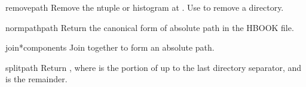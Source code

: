\begin{methoddesc}{remove}{path}
 Remove the ntuple or histogram at .  Use  to
 remove a directory.
\end{methoddesc}

\begin{methoddesc}{normpath}{path}
 Return the canonical form of absolute path  in the HBOOK
 file.
\end{methoddesc}

\begin{methoddesc}{join}{*components}
 Join together  to form an absolute path.
\end{methoddesc}

\begin{methoddesc}{split}{path}
 Return , where  is the portion of 
 up to the last directory separator, and  is the remainder.
\end{methoddesc}

